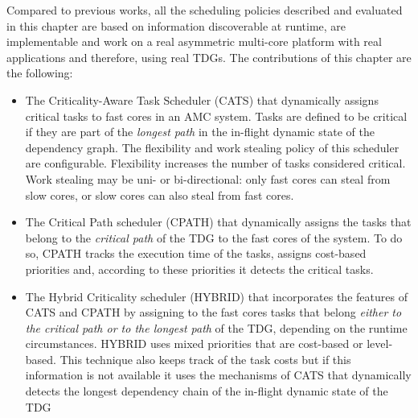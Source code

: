 Compared to previous works, all the scheduling policies described and evaluated in this chapter are based on information discoverable at runtime, are implementable and work on a real asymmetric multi-core platform with real applications and therefore, using real TDGs.
The contributions of this chapter are the following: 
\begin{itemize}
 \item{The Criticality-Aware Task Scheduler (CATS) that dynamically assigns critical tasks to fast cores in an AMC system. Tasks are defined to be critical if they are part of the \textit{longest path} in the in-flight dynamic state of the dependency graph. The flexibility and work stealing policy of this scheduler are configurable. Flexibility increases the number of tasks considered critical. Work stealing may be uni- or bi-directional: only fast cores can steal from slow cores, or slow cores can also steal from fast cores.}
 \item{The Critical Path scheduler (CPATH) that dynamically assigns the tasks that belong to the \textit{critical path} of the TDG to the fast cores of the system. To do so, CPATH tracks the execution time of the tasks, assigns cost-based priorities and, according to these priorities it detects the critical tasks.}
 \item{The Hybrid Criticality scheduler (HYBRID) that incorporates the features of CATS and CPATH by assigning to the fast cores tasks that belong \textit{either to the critical path or to the longest path} of the TDG, depending on the runtime circumstances. HYBRID uses mixed priorities that are cost-based or level-based. This technique also keeps track of the task costs but if this information is not available it uses the mechanisms of CATS that dynamically detects the longest dependency chain of the in-flight dynamic state of the TDG}
 

\end{itemize}
